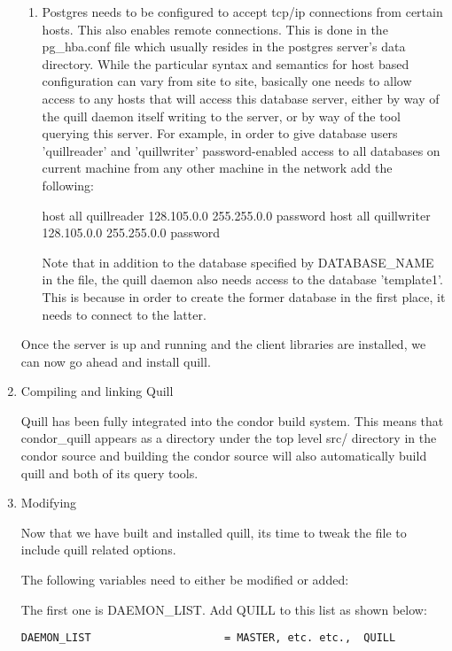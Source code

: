 \begin{enumerate}
\begin{enumerate}
\item Postgres needs to be configured to accept tcp/ip connections from
certain hosts.  This also enables remote connections.  This is done in
the pg\_hba.conf file which usually resides in the postgres server's
data directory.  While the particular syntax and semantics for host
based configuration can vary from site to site, basically one needs
to allow access to any hosts that will access this database server,
either by way of the quill daemon itself writing to the server, or by
way of the  tool querying this server.  For example, in order
to give database users 'quillreader' and 'quillwriter' password-enabled
access to all databases on current machine from any other machine in
the network add the following:

host    all       quillreader       128.105.0.0       255.255.0.0    password
host    all       quillwriter       128.105.0.0       255.255.0.0    password

Note that in addition to the database specified by DATABASE\_NAME in the
 file, the quill daemon also needs access to the database
'template1'.  This is because in order to create the former database in
the first place, it needs to connect to the latter.

\end{enumerate}

Once the server is up and running and the client libraries are installed, 
we can now go ahead and install quill.  

\item Compiling and linking Quill

Quill has been fully integrated into the condor build system.  This means
that condor\_quill appears as a directory under the top level src/
directory in the condor source and building the condor source will also
automatically build quill and both of its query tools.

\item Modifying 

Now that we have built and installed quill, its time to tweak the 
 file to include quill related options.

The following variables need to either be modified or added:

The first one is DAEMON\_LIST.  Add QUILL to this list as shown below:
\begin{verbatim}
DAEMON_LIST                     = MASTER, etc. etc.,  QUILL
\end{verbatim}


\end{enumerate}
